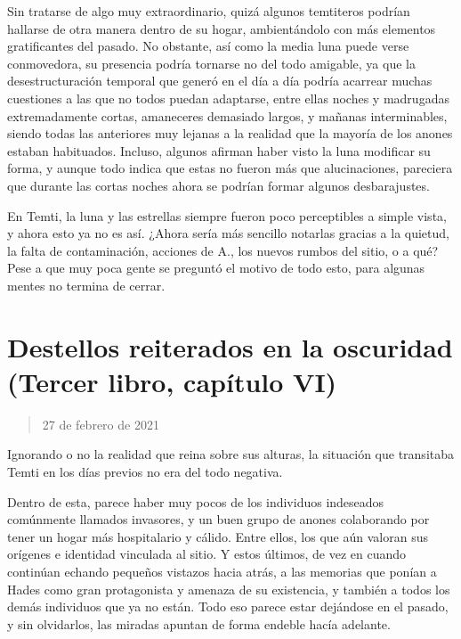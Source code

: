 \documentclass[
]{book}
\begin{document}
Sin tratarse de algo muy extraordinario, quizá algunos temtiteros podrían hallarse de otra manera dentro de su hogar, ambientándolo con más elementos gratificantes del pasado. No obstante, así como la media luna puede verse conmovedora, su presencia podría tornarse no del todo amigable, ya que la desestructuración temporal que generó en el día a día podría acarrear muchas cuestiones a las que no todos puedan adaptarse, entre ellas noches y madrugadas extremadamente cortas, amaneceres demasiado largos, y mañanas interminables, siendo todas las anteriores muy lejanas a la realidad que la mayoría de los anones estaban habituados. Incluso, algunos afirman haber visto la luna modificar su forma, y aunque todo indica que estas no fueron más que alucinaciones, pareciera que durante las cortas noches ahora se podrían formar algunos desbarajustes.

En Temti, la luna y las estrellas siempre fueron poco perceptibles a simple vista, y ahora esto ya no es así. ¿Ahora sería más sencillo notarlas gracias a la quietud, la falta de contaminación, acciones de A., los nuevos rumbos del sitio, o a qué? Pese a que muy poca gente se preguntó el motivo de todo esto, para algunas mentes no termina de cerrar.

\hypertarget{destellos-reiterados-en-la-oscuridad-tercer-libro-capuxedtulo-vi}{%
\section{Destellos reiterados en la oscuridad (Tercer libro, capítulo VI)}\label{destellos-reiterados-en-la-oscuridad-tercer-libro-capuxedtulo-vi}}

\begin{quote}
27 de febrero de 2021
\end{quote}

Ignorando o no la realidad que reina sobre sus alturas, la situación que transitaba Temti en los días previos no era del todo negativa.

Dentro de esta, parece haber muy pocos de los individuos indeseados comúnmente llamados invasores, y un buen grupo de anones colaborando por tener un hogar más hospitalario y cálido. Entre ellos, los que aún valoran sus orígenes e identidad vinculada al sitio. Y estos últimos, de vez en cuando continúan echando pequeños vistazos hacia atrás, a las memorias que ponían a Hades como gran protagonista y amenaza de su existencia, y también a todos los demás individuos que ya no están. Todo eso parece estar dejándose en el pasado, y sin olvidarlos, las miradas apuntan de forma endeble hacía adelante.
\end{document}
